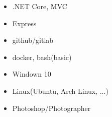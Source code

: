 
\begin{keywords}
	{
		\begin{itemize}
			\item .NET Core, MVC
			\item Express
		\end{itemize}
	}
	
	{
		\begin{itemize}
			\item github/gitlab
			\item docker, bash(basic)
		\end{itemize}
	}
	
	{
		\begin{itemize}
			\item Windown 10
			\item Linux(Ubuntu, Arch Linux, ...)
		\end{itemize}
	}
	
	{
		\begin{itemize}
			\item Photoshop/Photographer
		\end{itemize}

	}
	
\end{keywords}
